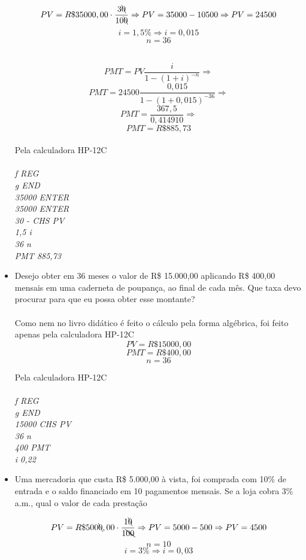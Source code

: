 \documentclass[a4paper, 12pt]{article}
\begin{document}
\begin{itemize}
$$ PV = R\$35000,00 \cdot \frac{3\bcancel{0}}{10\bcancel{0}} \Rightarrow PV = 35000 - 10500 \Rightarrow PV = 24500 $$
$$ i = 1,5\% \Rightarrow i = 0,015 $$
$$ n = 36 $$

\\
$$ PMT = PV\frac{i}{1-(1+i)^{-n}} \Rightarrow $$
$$ PMT = 24500\frac{0,015}{1-(1+0,015)^{-36}} \Rightarrow $$
$$ PMT = \frac{367,5}{0,414910} \Rightarrow $$
$$ \boxed{PMT = R\$885,73} $$
\\
Pela calculadora HP-12C\\\\
\emph{f REG}\\
\emph{g END}\\
\emph{35000 ENTER}\\
\emph{35000 ENTER}\\
\emph{30  \div - CHS PV} \\
\emph{1,5 i} \\
\emph{36 n}\\
\emph{PMT 885,73}\\

\item Desejo obter em 36 meses o valor de R\$ 15.000,00 aplicando R\$ 400,00 
mensais em uma caderneta de poupança, ao final de cada mês. Que taxa devo 
procurar para que eu possa obter esse montante? \\\\

Como nem no livro didático é feito o cálculo pela forma algébrica, foi feito apenas pela calculadora HP-12C \\

$$ PV = R\$15000,00 $$
$$ PMT = R\$400,00 $$
$$ n = 36 $$

Pela calculadora HP-12C\\\\
\emph{f REG}\\
\emph{g END}\\
\emph{15000 CHS PV}\\
\emph{36 n}\\
\emph{400 PMT}\\
\emph{i 0,22}  

\item Uma mercadoria que custa R\$ 5.000,00 à vista, foi comprada com 10\% de 
entrada e o saldo financiado em 10 pagamentos mensais. Se a loja cobra 3\% 
a.m., qual o valor de cada prestação

$$ PV = R\$500\bcancel{0},00 \cdot \frac{1\bcancel{0}}{1\bcancel{00}} \Rightarrow PV = 5000 - 500 \Rightarrow PV = 4500 $$
$$ n = 10 $$
$$ i = 3\% \Rightarrow i = 0,03 $$


\end{itemize}
\end{document}
